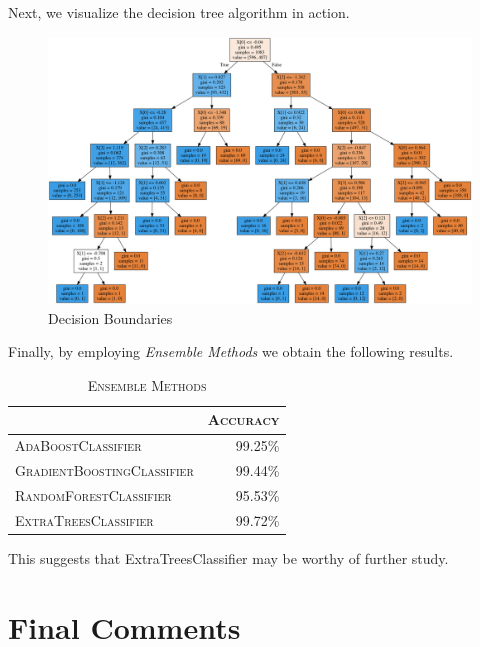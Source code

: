 \documentclass[a4paper,11pt]{amsart}
\begin{document}
\medbreak 

Next, we visualize the decision tree algorithm in action.

\pagebreak 

\begin{figure}
 \includegraphics[width=1.15\columnwidth]{bank_note_tree.png}
  \caption{Decision Boundaries}
  \label{fig:dsb}
\end{figure}

\medbreak

Finally, by employing \emph{Ensemble Methods} we obtain the following results.
\begin{table}[h!]
  \begin{center}
    \caption{\textsc{Ensemble Methods}}
    \label{tab:table6}
    \begin{tabular}{l|r|} 
      & \textsc{Accuracy}\\
      \hline
      \textsc{AdaBoostClassifier}& 99.25\% \\
      \textsc{GradientBoostingClassifier}& 99.44\%\\
      \textsc{RandomForestClassifier} & 95.53\%\\
      \textsc{ExtraTreesClassifier} & 99.72\%\\
    \end{tabular}
  \end{center}
\end{table}

\medbreak

This suggests that ExtraTreesClassifier may be worthy of further study.

\section{Final Comments}\label{future}
\end{document}
